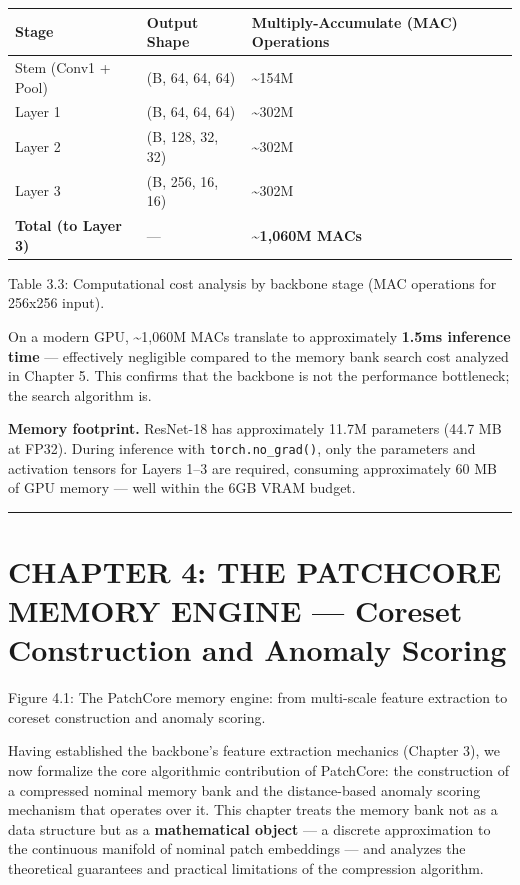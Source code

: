 \begin{longtable}[]{@{}lll@{}}
\toprule\noalign{}
Stage & Output Shape & Multiply-Accumulate (MAC) Operations \\
\midrule\noalign{}
\endhead
\bottomrule\noalign{}
\endlastfoot
Stem (Conv1 + Pool) & (B, 64, 64, 64) & \textasciitilde154M \\
Layer 1 & (B, 64, 64, 64) & \textasciitilde302M \\
Layer 2 & (B, 128, 32, 32) & \textasciitilde302M \\
Layer 3 & (B, 256, 16, 16) & \textasciitilde302M \\
\textbf{Total (to Layer 3)} & --- & \textbf{\textasciitilde1,060M MACs} \\
\end{longtable}

Table 3.3: Computational cost analysis by backbone stage (MAC operations for 256x256 input).

On a modern GPU, \textasciitilde1,060M MACs translate to approximately \textbf{1.5ms inference time} --- effectively negligible compared to the memory bank search cost analyzed in Chapter 5. This confirms that the backbone is not the performance bottleneck; the search algorithm is.

\textbf{Memory footprint.} ResNet-18 has approximately 11.7M parameters (44.7 MB at FP32). During inference with \texttt{torch.no\_grad()}, only the parameters and activation tensors for Layers 1--3 are required, consuming approximately 60 MB of GPU memory --- well within the 6GB VRAM budget.

\begin{center}\rule{0.5\linewidth}{0.5pt}\end{center}

\section{CHAPTER 4: THE PATCHCORE MEMORY ENGINE --- Coreset Construction and Anomaly Scoring}\label{chapter-4-the-patchcore-memory-engine-coreset-construction-and-anomaly-scoring}

Figure 4.1: The PatchCore memory engine: from multi-scale feature extraction to coreset construction and anomaly scoring.

Having established the backbone's feature extraction mechanics (Chapter 3), we now formalize the core algorithmic contribution of PatchCore: the construction of a compressed nominal memory bank and the distance-based anomaly scoring mechanism that operates over it. This chapter treats the memory bank not as a data structure but as a \textbf{mathematical object} --- a discrete approximation to the continuous manifold of nominal patch embeddings --- and analyzes the theoretical guarantees and practical limitations of the compression algorithm.

